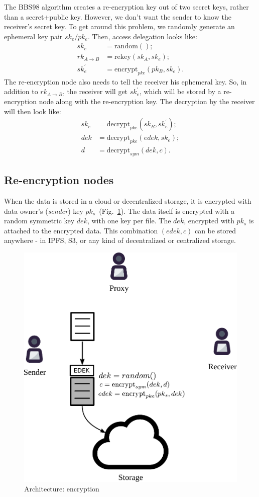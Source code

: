 \documentclass[notitlepage,longbibliography]{revtex4-1}
\begin{document}
The BBS98 algorithm creates a re-encryption key out of two secret keys, rather than a secret+public key.
However, we don't want the sender to know the receiver's secret key.
To get around this problem, we randomly generate an ephemeral key pair $sk_e/pk_e$.
Then, access delegation looks like:
\begin{align}
    sk_e &= \text{random}();\\
    rk_{A\rightarrow B} &= \text{rekey}(sk_A, sk_e);\\
    sk_e^{\prime} &= \text{encrypt}_{pke}(pk_B, sk_e).
\end{align}
The re-encryption node also needs to tell the receiver his ephemeral key.
So, in addition to $rk_{A\rightarrow B}$, the receiver will get $sk_e^{\prime}$, which will be stored by a re-encryption node along with the re-encryption key.
The decryption by the receiver will then look like:
\begin{align}
    sk_e &= \text{decrypt}_{pke}(sk_B, sk_e^{\prime});\\
    dek &= \text{decrypt}_{pke}(edek, sk_e);\\
    d &= \text{decrypt}_{sym}(dek, c).
\end{align}

\subsection{Re-encryption nodes}

When the data is stored in a cloud or decentralized storage, it is encrypted with data owner's (\emph{sender}) key $pk_s$~(Fig.~\ref{fig:arch-encrypt}).
The data itself is encrypted with a random symmetric key $dek$, with one key per file.
The $dek$, encrypted with $pk_s$ is attached to the encrypted data.
This combination $(edek, c)$ can be stored anywhere - in IPFS, S3, or any kind of decentralized or centralized storage.
\begin{figure}
\centering
    \includegraphics[width=0.4\columnwidth]{pdf/encrypt.pdf}
    \caption{Architecture: encryption}
    \label{fig:arch-encrypt}
\end{figure}
\end{document}
